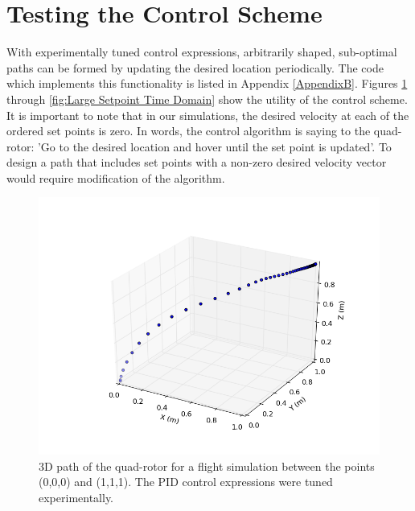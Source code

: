 \section{Testing the Control Scheme}

With experimentally tuned control expressions, arbitrarily shaped, sub-optimal paths can be formed by updating the desired location periodically. The code which implements this functionality is listed in Appendix \ref{AppendixB}. Figures \ref{fig:Typical Run 3D Path} through \ref{fig:Large Setpoint Time Domain} show the utility of the control scheme. It is important to note that in our simulations, the desired velocity at each of the ordered set points is zero. In words, the control algorithm is saying to the quad-rotor: 'Go to the desired location and hover until the set point is updated'. To design a path that includes set points with a non-zero desired velocity vector would require modification of the algorithm.
\begin{figure}[htbp]
	\centering
		\includegraphics[scale = 0.4]{Figures/typical_run_time_3D_path.png}
	\caption[3D path of the quad-rotor for a flight simulation between the points (0,0,0) and (1,1,1). The PID control expressions were tuned experimentally.]{3D path of the quad-rotor for a flight simulation between the points (0,0,0) and (1,1,1). The PID control expressions were tuned experimentally.}
	\label{fig:Typical Run 3D Path}
\end{figure}
